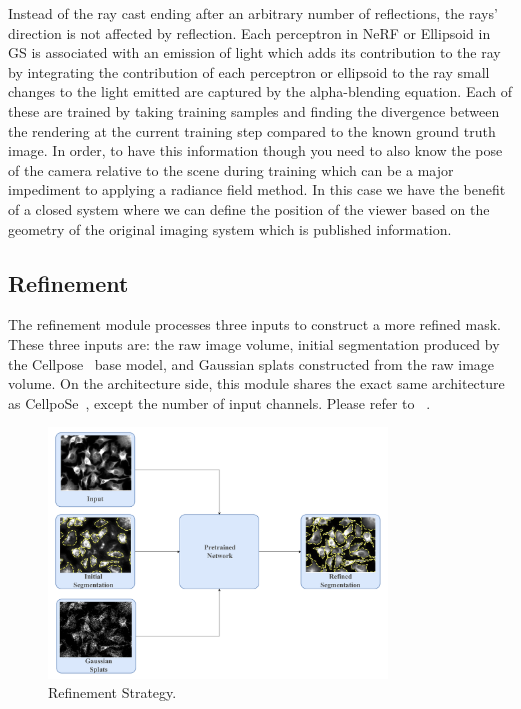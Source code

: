 Instead of the ray cast ending after an arbitrary number of reflections, the rays’ direction is not affected by reflection.  Each perceptron in NeRF or Ellipsoid in GS is associated with an emission of light which adds its contribution to the ray by integrating the contribution of each perceptron or ellipsoid to the ray small changes to the light emitted are captured by the alpha-blending equation. Each of these are trained by taking training samples and finding the divergence between the rendering at the current training step compared to the known ground truth image.  In order, to have this information though you need to also know the pose of the camera relative to the scene during training which can be a major impediment to applying a radiance field method. In this case we have the benefit of a closed system where we can define the position of the viewer based on the geometry of the original imaging system which is published information.  \\

\subsection{Refinement}
The refinement module processes three inputs to construct a more refined mask. These three inputs are: the raw image volume, initial segmentation produced by the Cellpose~\cite{stringer2021cellpose} base model, and Gaussian splats constructed from the raw image volume. On the architecture side, this module shares the exact same architecture as CellpoSe~\cite{stringer2021cellpose}, except the number of input channels. Please refer to ~.

\begin{figure}[t]
    \centering
    \includegraphics[width=9cm]{figs/refinement.pdf}
    \caption{Refinement Strategy.}
    \label{fig:refinement}
\end{figure}

